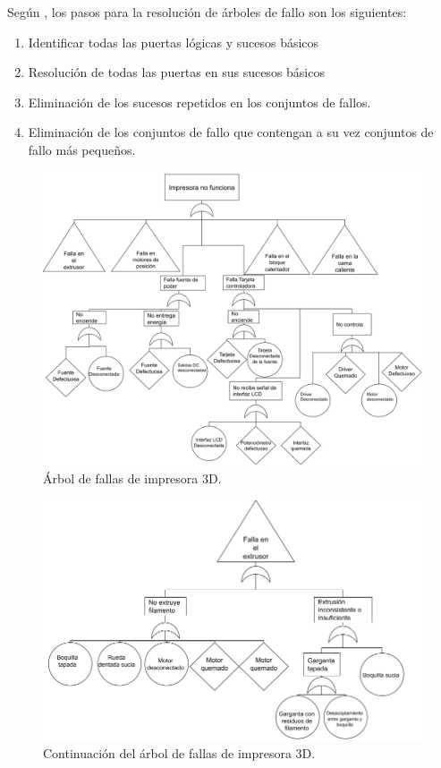 Según \cite{pique1998}, los pasos para la resolución de árboles de fallo son los siguientes:

\begin{enumerate}
\item Identificar todas las puertas lógicas y sucesos básicos
\item Resolución de todas las puertas en sus sucesos básicos
\item Eliminación de los sucesos repetidos en los conjuntos de fallos.
\item Eliminación de los conjuntos de fallo que contengan a su vez conjuntos de fallo más pequeños.
\end{enumerate}

\begin{figure}[H]
\centering
\includegraphics[scale=0.4]{images/arbol/arbol1.png}
\caption{Árbol de fallas de impresora 3D.}
\end{figure}

\begin{figure}[H]
\centering
\includegraphics[scale=0.4]{images/arbol/arbol2.png}
\caption{Continuación del árbol de fallas de impresora 3D.}
\end{figure}

